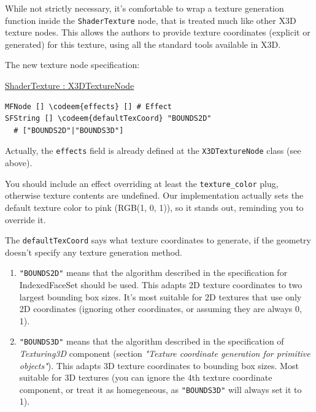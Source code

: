 \documentclass{acmsiggraph}                     %
\newenvironment{mycode}
{\begin{mycodecore}}
{\end{mycodecore}
\vspace{-0.1in}}
\newcommand*{\codeem}[1]{\textbf{#1}}
\newenvironment{myenumerate}
{\begin{enumerate}
  \setlength{\itemsep}{0pt}
  \setlength{\parskip}{0pt}
  \setlength{\parsep}{0pt}}
{\end{enumerate}}
\begin{document}
While not strictly necessary, it's comfortable to wrap a texture generation
function inside the \texttt{ShaderTexture} node, that is treated much
like other X3D texture nodes. This allows the authors to provide texture
coordinates (explicit or generated) for this texture, using all the standard
tools available in X3D.

The new texture node specification:

\begin{mycode}
\underline{ShaderTexture : X3DTextureNode}
\begin{Verbatim}[commandchars=\\\{\}]
MFNode [] \codeem{effects} [] # Effect
SFString [] \codeem{defaultTexCoord} "BOUNDS2D"
  # ["BOUNDS2D"|"BOUNDS3D"]
\end{Verbatim}
\end{mycode}

Actually, the \texttt{effects} field is already defined at
the \texttt{X3DTextureNode} class (see above).

You should include an effect overriding at least the \texttt{texture\_color}
plug, otherwise texture contents are undefined. Our implementation actually
sets the default texture color to pink (RGB(1, 0, 1)), so it stands out,
reminding you to override it.

The \texttt{defaultTexCoord} says what texture coordinates to generate,
if the geometry doesn't specify any texture generation method.

\begin{myenumerate}

\item
  \texttt{"BOUNDS2D"} means that the algorithm described in the specification
  for {IndexedFaceSet} should be used. This adapts 2D texture coordinates
  to two largest bounding box sizes.
  It's most suitable for 2D textures that use only 2D coordinates
  (ignoring other coordinates, or assuming they are always 0, 1).

\item
  \texttt{"BOUNDS3D"} means that the algorithm described in the specification
  of \textit{Texturing3D} component (section \textit{"Texture coordinate generation for primitive objects"}).
  This adapts 3D texture coordinates to bounding box sizes.
  Most suitable for 3D textures (you can ignore the 4th texture coordinate
  component, or treat it as homegeneous, as \texttt{"BOUNDS3D"} will always
  set it to 1).

\end{myenumerate}
\end{document}
